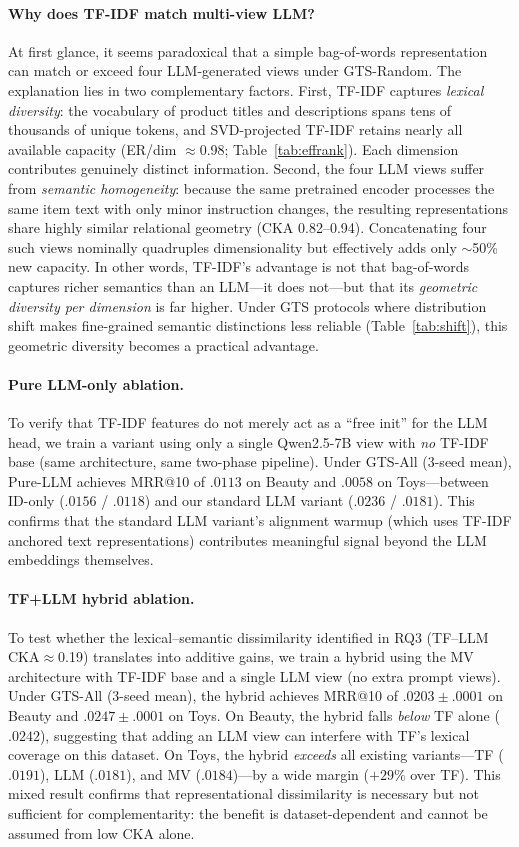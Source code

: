 \documentclass[sigconf,natbib=true,anonymous]{acmart}
\newcommand{\tfidf}{\textsc{TF-IDF}\xspace}
\begin{document}
\paragraph{Why does TF-IDF match multi-view LLM?}
At first glance, it seems paradoxical that a simple bag-of-words representation can match or exceed four LLM-generated views under GTS-Random.
The explanation lies in two complementary factors.
First, \tfidf captures \emph{lexical diversity}: the vocabulary of product titles and descriptions spans tens of thousands of unique tokens, and SVD-projected TF-IDF retains nearly all available capacity (ER/dim $\approx$0.98; Table~\ref{tab:effrank}).
Each dimension contributes genuinely distinct information.
Second, the four LLM views suffer from \emph{semantic homogeneity}: because the same pretrained encoder processes the same item text with only minor instruction changes, the resulting representations share highly similar relational geometry (CKA 0.82--0.94).
Concatenating four such views nominally quadruples dimensionality but effectively adds only $\sim$50\% new capacity.
In other words, TF-IDF's advantage is not that bag-of-words captures richer semantics than an LLM---it does not---but that its \emph{geometric diversity per dimension} is far higher.
Under GTS protocols where distribution shift makes fine-grained semantic distinctions less reliable (Table~\ref{tab:shift}), this geometric diversity becomes a practical advantage.

\paragraph{Pure LLM-only ablation.}
To verify that TF-IDF features do not merely act as a ``free init'' for the LLM head, we train a variant using only a single Qwen2.5-7B view with \emph{no} TF-IDF base (same architecture, same two-phase pipeline).
Under GTS-All (3-seed mean), Pure-LLM achieves MRR@10 of $.0113$ on Beauty and $.0058$ on Toys---between ID-only ($.0156$ / $.0118$) and our standard LLM variant ($.0236$ / $.0181$).
This confirms that the standard LLM variant's alignment warmup (which uses TF-IDF anchored text representations) contributes meaningful signal beyond the LLM embeddings themselves.

\paragraph{TF+LLM hybrid ablation.}
To test whether the lexical--semantic dissimilarity identified in RQ3 (TF--LLM CKA$\approx$0.19) translates into additive gains, we train a hybrid using the MV architecture with \tfidf base and a single LLM view (no extra prompt views).
Under GTS-All (3-seed mean), the hybrid achieves MRR@10 of $.0203\pm.0001$ on Beauty and $.0247\pm.0001$ on Toys.
On Beauty, the hybrid falls \emph{below} TF alone ($.0242$), suggesting that adding an LLM view can interfere with TF's lexical coverage on this dataset.
On Toys, the hybrid \emph{exceeds} all existing variants---TF ($.0191$), LLM ($.0181$), and MV ($.0184$)---by a wide margin ($+29\%$ over TF).
This mixed result confirms that representational dissimilarity is necessary but not sufficient for complementarity: the benefit is dataset-dependent and cannot be assumed from low CKA alone.
\end{document}
